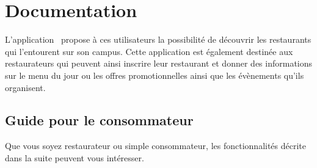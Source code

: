 \section{Documentation}

L'application \appname~propose à ces utilisateurs la possibilité de découvrir les restaurants qui l'entourent sur son campus. Cette application est également destinée aux restaurateurs qui peuvent ainsi inscrire leur restaurant et donner des informations sur le menu du jour ou les offres promotionnelles ainsi que les évènements qu'ils organisent.


\subsection{Guide pour le consommateur}

Que vous soyez restaurateur ou simple consommateur, les fonctionnalités décrite dans la suite peuvent vous intéresser. \\


